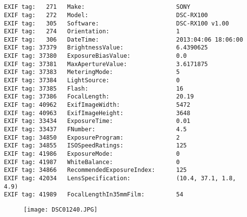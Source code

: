 \section{\protect{}}
\noindent 
\noindent
\begin{lstlisting}
EXIF tag:   271   Make:                          SONY
EXIF tag:   272   Model:                         DSC-RX100
EXIF tag:   305   Software:                      DSC-RX100 v1.00
EXIF tag:   274   Orientation:                   1
EXIF tag:   306   DateTime:                      2013:04:06 18:06:00
EXIF tag: 37379   BrightnessValue:               6.4390625
EXIF tag: 37380   ExposureBiasValue:             0.0
EXIF tag: 37381   MaxApertureValue:              3.6171875
EXIF tag: 37383   MeteringMode:                  5
EXIF tag: 37384   LightSource:                   0
EXIF tag: 37385   Flash:                         16
EXIF tag: 37386   FocalLength:                   20.19
EXIF tag: 40962   ExifImageWidth:                5472
EXIF tag: 40963   ExifImageHeight:               3648
EXIF tag: 33434   ExposureTime:                  0.01
EXIF tag: 33437   FNumber:                       4.5
EXIF tag: 34850   ExposureProgram:               2
EXIF tag: 34855   ISOSpeedRatings:               125
EXIF tag: 41986   ExposureMode:                  0
EXIF tag: 41987   WhiteBalance:                  0
EXIF tag: 34866   RecommendedExposureIndex:      125
EXIF tag: 42034   LensSpecification:             (10.4, 37.1, 1.8, 4.9)
EXIF tag: 41989   FocalLengthIn35mmFilm:         54

\end{lstlisting}
\clearpage
\begin{figure}
\raggedleft
\texttt{[image: DSC01240.JPG]}
\end{figure}


\clearpage
